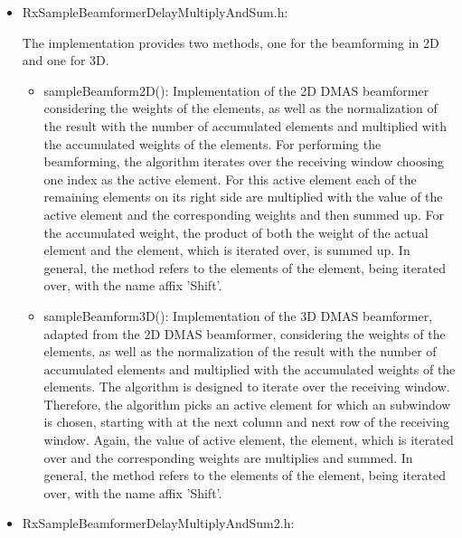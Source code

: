 \documentclass[12pt,a4paper,oneside]{scrartcl}
\begin{document}
\begin{itemize}
  \item RxSampleBeamformerDelayMultiplyAndSum.h:

    The implementation provides two methods, one for the beamforming in 2D and one for 3D.
      \begin{itemize}
        \item sampleBeamform2D():
          Implementation of the 2D DMAS beamformer considering the weights of the elements, as well as the normalization of the result with the number of accumulated elements and multiplied with the accumulated weights of the elements.
          For performing the beamforming, the algorithm iterates over the receiving window choosing one index as the active element.
          For this active element each of the remaining elements on its right side are multiplied with the value of the active element and the corresponding weights and then summed up.
          For the accumulated weight, the product of both the weight of the actual element and the element, which is iterated over, is summed up.
          In general, the method refers to the elements of the element, being iterated over, with the name affix 'Shift'.
        \item sampleBeamform3D():
          Implementation of the 3D DMAS beamformer, adapted from the 2D DMAS beamformer, considering the weights of the elements, as well as the normalization of the result with the number of accumulated elements and multiplied with the accumulated weights of the elements.
          The algorithm is designed to iterate over the receiving window.
          Therefore, the algorithm picks an active element for which an subwindow is chosen, starting with at the next column and next row of the receiving window.
          Again, the value of active element, the element, which is iterated over and the corresponding weights are multiplies and summed.
          In general, the method refers to the elements of the element, being iterated over, with the name affix 'Shift'.
      \end{itemize}

  \item RxSampleBeamformerDelayMultiplyAndSum2.h:


\end{itemize}
\end{document}

